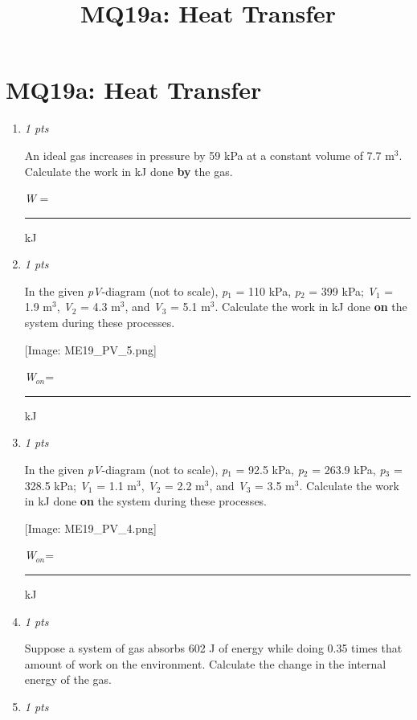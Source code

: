 \documentclass[11pt]{article}
\title{MQ19a: Heat Transfer}
\author{}
\date{}
\begin{document}
\maketitle

\section*{MQ19a: Heat Transfer}

\begin{enumerate}[leftmargin=*,label=\textbf{Question \arabic*.}]

\item \hfill \textit{1 pts}

An ideal gas increases in pressure by 59 kPa at a constant volume of 7.7 m$^{3}$.  Calculate the work in kJ done \textbf{by} the gas.



\emph{W} = \rule{2.5cm}{0.4pt} kJ

\item \hfill \textit{1 pts}

In the given \emph{pV}-diagram (not to scale), \emph{p}$_{1}$ = 110 kPa, \emph{p}$_{2}$ = 399 kPa; \emph{V}$_{1}$ = 1.9 m$^{3}$, \emph{V}$_{2}$ = 4.3 m$^{3}$, and \emph{V}$_{3}$ = 5.1 m$^{3}$. Calculate the work in kJ done \textbf{on} the system during these processes.

    [Image: ME19\_PV\_5.png]



\emph{W}$_{on}$\emph{}= \rule{2.5cm}{0.4pt} kJ

\item \hfill \textit{1 pts}

In the given \emph{pV}-diagram (not to scale), \emph{p}$_{1}$ = 92.5 kPa, \emph{p}$_{2}$ = 263.9 kPa, \emph{p}$_{3}$ = 328.5 kPa; \emph{V}$_{1}$ = 1.1 m$^{3}$, \emph{V}$_{2}$ = 2.2 m$^{3}$, and \emph{V}$_{3}$ = 3.5 m$^{3}$. Calculate the work in kJ done \textbf{on} the system during these processes.

     [Image: ME19\_PV\_4.png]



\emph{W}$_{on}$\emph{}= \rule{2.5cm}{0.4pt} kJ

\item \hfill \textit{1 pts}

Suppose a system of gas absorbs 602 J of energy while doing 0.35 times that amount of work on the environment. Calculate the change in the internal energy of the gas.

\item \hfill \textit{1 pts}


\end{enumerate}
\end{document}
